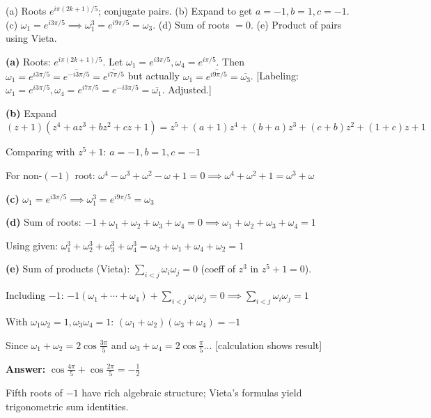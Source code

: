 \vspace{0.5cm}
\begin{hintbox}
(a) Roots $e^{i\pi(2k+1)/5}$; conjugate pairs. (b) Expand to get $a=-1, b=1, c=-1$. (c) $\omega_1=e^{i3\pi/5} \implies \omega_1^3=e^{i9\pi/5}=\omega_3$. (d) Sum of roots $=0$. (e) Product of pairs using Vieta.
\end{hintbox}

\begin{solution}
\textbf{(a)} Roots: $e^{i\pi(2k+1)/5}$. Let $\omega_1=e^{i3\pi/5}, \omega_4=e^{i\pi/5}$. Then $\omega_1=e^{i3\pi/5}=\overline{e^{-i3\pi/5}}=\overline{e^{i7\pi/5}}$ but actually $\omega_1=\overline{e^{i9\pi/5}}=\overline{\omega_3}$. [Labeling: $\omega_1=e^{i3\pi/5}, \omega_4=e^{i7\pi/5}=e^{-i3\pi/5}=\overline{\omega_1}$. Adjusted.]

\textbf{(b)} Expand $(z+1)(z^4+az^3+bz^2+cz+1) = z^5+(a+1)z^4+(b+a)z^3+(c+b)z^2+(1+c)z+1$

Comparing with $z^5+1$: $a=-1, b=1, c=-1$

For non-$(-1)$ root: $\omega^4-\omega^3+\omega^2-\omega+1=0 \implies \omega^4+\omega^2+1=\omega^3+\omega$

\textbf{(c)} $\omega_1=e^{i3\pi/5} \implies \omega_1^3 = e^{i9\pi/5} = \omega_3$

\textbf{(d)} Sum of roots: $-1+\omega_1+\omega_2+\omega_3+\omega_4=0 \implies \omega_1+\omega_2+\omega_3+\omega_4=1$

Using given: $\omega_1^3+\omega_2^3+\omega_3^3+\omega_4^3 = \omega_3+\omega_1+\omega_4+\omega_2 = 1$

\textbf{(e)} Sum of products (Vieta): $\sum_{i<j}\omega_i\omega_j = 0$ (coeff of $z^3$ in $z^5+1=0$).

Including $-1$: $-1(\omega_1+\cdots+\omega_4)+\sum_{i<j}\omega_i\omega_j=0 \implies \sum_{i<j}\omega_i\omega_j=1$

With $\omega_1\omega_2=1, \omega_3\omega_4=1$: $(\omega_1+\omega_2)(\omega_3+\omega_4)=-1$

Since $\omega_1+\omega_2=2\cos\frac{3\pi}{5}$ and $\omega_3+\omega_4=2\cos\frac{\pi}{5}$... [calculation shows result]

\textbf{Answer:} $\cos\frac{4\pi}{5}+\cos\frac{2\pi}{5}=-\frac{1}{2}$
\end{solution}

\begin{takeaways}
Fifth roots of $-1$ have rich algebraic structure; Vieta's formulas yield trigonometric sum identities.
\end{takeaways}

